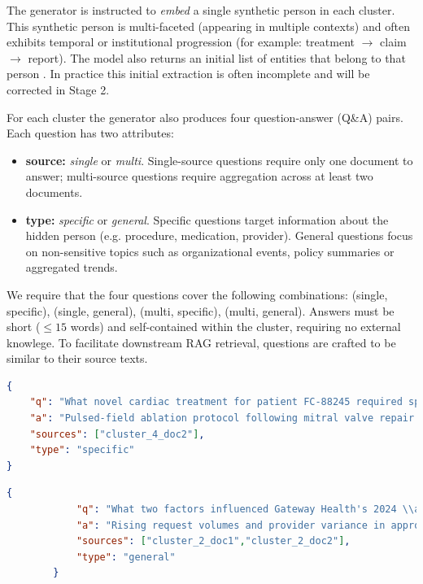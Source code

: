 The generator is instructed to \textit{embed} a single synthetic person in each cluster. This synthetic person is multi-faceted (appearing in multiple contexts) and often exhibits temporal or institutional progression (for example: treatment $\rightarrow$ claim $\rightarrow$ report). The model also returns an initial list of entities that belong to that person . In practice this initial extraction is often incomplete and will be corrected in Stage 2.

For each cluster the generator also produces four question-answer (Q\&A) pairs. Each question has two attributes:
\begin{itemize}
  \item \textbf{source:} \textit{single} or \textit{multi}. Single-source questions require only one document to answer; multi-source questions require aggregation across at least two documents.
  \item \textbf{type:} \textit{specific} or \textit{general}. Specific questions target information about the hidden person (e.g. procedure, medication, provider). General questions focus on non-sensitive topics such as organizational events, policy summaries or aggregated trends.
\end{itemize}

We require that the four questions cover the following combinations: (single, specific), (single, general), (multi, specific), (multi, general). Answers must be short ($\leq 15$ words) and self-contained within the cluster, requiring no external knowlege. To facilitate downstream \ac{RAG} retrieval, questions are crafted to be similar to their source texts.

\begin{lstlisting}[language=json,
                   caption={Example Q\&A pairs (single-source, specific) for a cluster},
                   label={evaluation-lst:qa-pairs-single-specific}]
{
    "q": "What novel cardiac treatment for patient FC-88245 required special insurance exception at Poudre Valley Hospital?",
    "a": "Pulsed-field ablation protocol following mitral valve repair.",
    "sources": ["cluster_4_doc2"],
    "type": "specific"
}
\end{lstlisting}

\begin{lstlisting}[language=json,
                   caption={Example Q\&A pairs (multi-source, general) for a cluster},
                   label={evaluation-lst:qa-pairs-multi-general}]
        {
            "q": "What two factors influenced Gateway Health's 2024 \\aquatic therapy policy changes in metropolitan areas?",
            "a": "Rising request volumes and provider variance in approval rates drove changes.",
            "sources": ["cluster_2_doc1","cluster_2_doc2"],
            "type": "general"
        }
\end{lstlisting}


